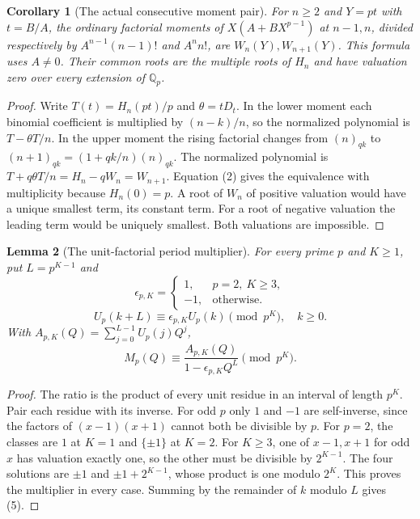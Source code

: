 \documentclass[11pt]{article}
\newtheorem{lemma}{Lemma}\newtheorem{proposition}[lemma]{Proposition}\newtheorem{theorem}[lemma]{Theorem}\newtheorem{corollary}[lemma]{Corollary}
\begin{document}
\begin{corollary}[The actual consecutive moment pair]\label{cor:critical}
For $n\ge2$ and $Y=pt$ with $t=B/A$, the ordinary factorial
moments of $X(A+BX^{p-1})$ at $n-1,n$, divided respectively by
$A^{n-1}(n-1)!$ and $A^n n!$, are $W_n(Y), W_{n+1}(Y)$.
This formula uses $A\ne0$. Their common roots are the
multiple roots of $H_n$ and have valuation zero over every
extension of $\mathbb Q_p$.
\end{corollary}
\begin{proof}
Write $T(t)=H_n(pt)/p$ and $\theta=tD_t$.
In the lower moment each binomial coefficient is multiplied
by $(n-k)/n$, so the normalized polynomial is $T-\theta T/n$.
In the upper moment the rising factorial changes from
$(n)_{qk}$ to $(n+1)_{qk}=(1+qk/n)(n)_{qk}$.
The normalized polynomial is $T+q\theta T/n=H_n-qW_n=W_{n+1}$.
Equation (2) gives the equivalence with multiplicity because
$H_n(0)=p$. A root of $W_n$ of positive valuation would have a
unique smallest term, its constant term. For a root of negative
valuation the leading term would be uniquely smallest.
Both valuations are impossible.
\end{proof}

\begin{lemma}[The unit-factorial period multiplier]\label{lem:antiperiod}
For every prime $p$ and $K\ge1$, put $L=p^{K-1}$ and
\[
 \epsilon_{p,K}=\begin{cases}
 1,&p=2,\ K\ge3,\\
 -1,&\text{otherwise}.
 \end{cases}
\]
\[
 U_p(k+L)\equiv\epsilon_{p,K}U_p(k)\pmod{p^K},\quad k\ge0. \tag{5}
\]
With $A_{p,K}(Q)=\sum_{j=0}^{L-1}U_p(j)Q^j$,
\[
 M_p(Q)\equiv\frac{A_{p,K}(Q)}{1-\epsilon_{p,K}Q^L}\pmod{p^K}.
 \tag{6}
\]
\end{lemma}
\begin{proof}
The ratio is the product of every unit residue in an interval
of length $p^K$. Pair each residue with its inverse. For odd
$p$ only $1$ and $-1$ are self-inverse, since the factors of
$(x-1)(x+1)$ cannot both be divisible by $p$.
For $p=2$, the classes are $1$ at $K=1$ and $\{\pm1\}$ at $K=2$.
For $K\ge3$, one of $x-1,x+1$ for odd $x$ has valuation exactly
one, so the other must be divisible by $2^{K-1}$.
The four solutions are $\pm1$ and $\pm1+2^{K-1}$, whose product
is one modulo $2^K$. This proves the multiplier in every case.
Summing by the remainder of $k$ modulo $L$ gives (5).
\end{proof}
\end{document}
